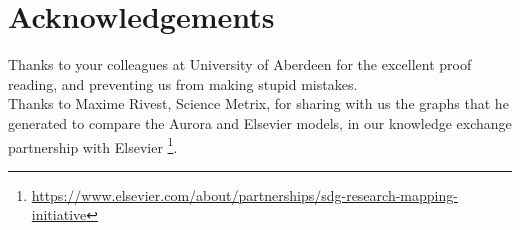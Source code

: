 \documentclass{article}
\begin{document}
\section{Acknowledgements}
Thanks to your colleagues at University of Aberdeen for the excellent proof reading, and preventing us from making stupid mistakes.\\
Thanks to Maxime Rivest, Science Metrix, for sharing with us the graphs that he generated to compare the Aurora and Elsevier models, in our knowledge exchange partnership with Elsevier \footnote{ \url{https://www.elsevier.com/about/partnerships/sdg-research-mapping-initiative}}. 

  

\end{document}
